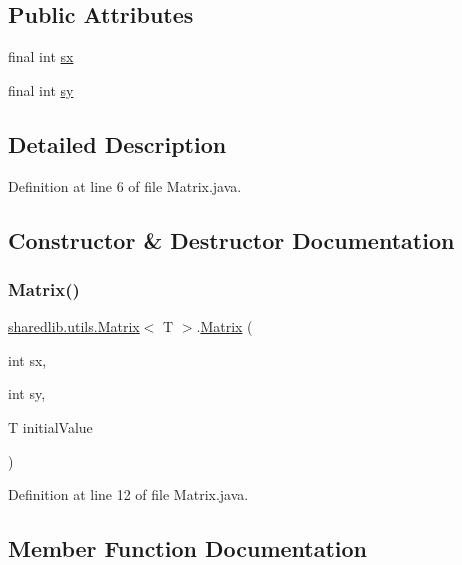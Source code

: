 \subsection*{Public Attributes}
\begin{DoxyCompactItemize}
\item 
final int \hyperlink{classsharedlib_1_1utils_1_1_matrix_afb6345b7525e7a0c51bd4f835248521b}{sx}
\item 
final int \hyperlink{classsharedlib_1_1utils_1_1_matrix_a184f78d2081c890cd3b09a15b37ea28c}{sy}
\end{DoxyCompactItemize}


\subsection{Detailed Description}


Definition at line 6 of file Matrix.\+java.



\subsection{Constructor \& Destructor Documentation}
\hypertarget{classsharedlib_1_1utils_1_1_matrix_acaf0ae26880860dd079ee63620353fd1}{}\label{classsharedlib_1_1utils_1_1_matrix_acaf0ae26880860dd079ee63620353fd1} 
\subsubsection{\texorpdfstring{Matrix()}{Matrix()}}
{\footnotesize\ttfamily \hyperlink{classsharedlib_1_1utils_1_1_matrix}{sharedlib.\+utils.\+Matrix}$<$ T $>$.\hyperlink{classsharedlib_1_1utils_1_1_matrix}{Matrix} (\begin{DoxyParamCaption}\item[{int}]{sx,  }\item[{int}]{sy,  }\item[{T}]{initial\+Value }\end{DoxyParamCaption})}



Definition at line 12 of file Matrix.\+java.



\subsection{Member Function Documentation}
\hypertarget{classsharedlib_1_1utils_1_1_matrix_a97de877e88587019e1a906c230a3b442}{}\label{classsharedlib_1_1utils_1_1_matrix_a97de877e88587019e1a906c230a3b442} 
